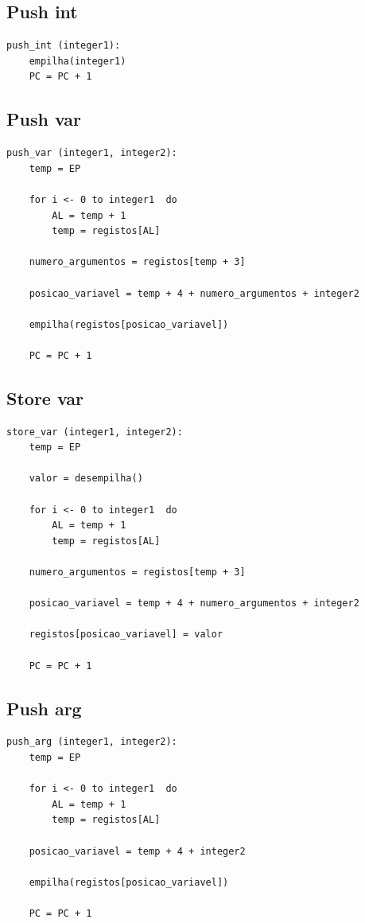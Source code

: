 \documentclass[a4paper,12pt,headings=small]{article}
\begin{document}
\newpage

\subsection{Push int}
\begin{lstlisting}
push_int (integer1):
	empilha(integer1)
	PC = PC + 1

\end{lstlisting}


\subsection{Push var}

\begin{lstlisting}
push_var (integer1, integer2):
	temp = EP	
	
	for i <- 0 to integer1	do
		AL = temp + 1
		temp = registos[AL]
	
	numero_argumentos = registos[temp + 3]
	
	posicao_variavel = temp + 4 + numero_argumentos + integer2
	
	empilha(registos[posicao_variavel])	
	
	PC = PC + 1

\end{lstlisting}


\subsection{Store var}
\begin{lstlisting}
store_var (integer1, integer2):
	temp = EP
	
	valor = desempilha()
	
	for i <- 0 to integer1	do
		AL = temp + 1
		temp = registos[AL]
	
	numero_argumentos = registos[temp + 3]
	
	posicao_variavel = temp + 4 + numero_argumentos + integer2
	
	registos[posicao_variavel] = valor
	
	PC = PC + 1

\end{lstlisting}

\newpage

\subsection{Push arg}
\begin{lstlisting}
push_arg (integer1, integer2):
	temp = EP	
	
	for i <- 0 to integer1	do
		AL = temp + 1
		temp = registos[AL]
	
	posicao_variavel = temp + 4 + integer2
	
	empilha(registos[posicao_variavel])	
	
	PC = PC + 1

\end{lstlisting}
\end{document}
